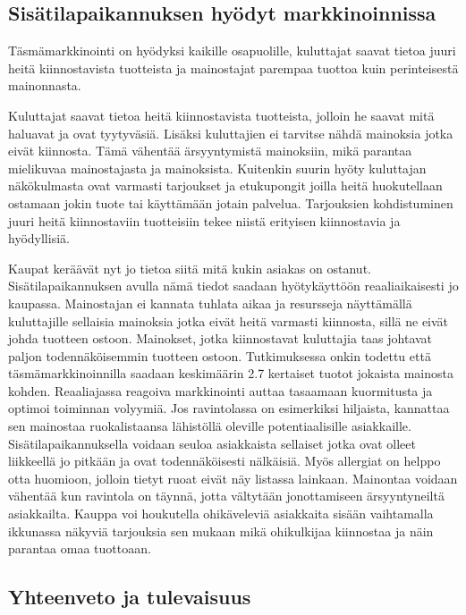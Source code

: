 \subsection{Sisätilapaikannuksen hyödyt markkinoinnissa}
Täsmämarkkinointi on hyödyksi kaikille osapuolille, kuluttajat saavat tietoa juuri heitä kiinnostavista tuotteista ja mainostajat parempaa tuottoa kuin perinteisestä mainonnasta.

Kuluttajat saavat tietoa heitä kiinnostavista tuotteista, jolloin he saavat mitä haluavat ja ovat tyytyväsiä. Lisäksi kuluttajien ei tarvitse nähdä mainoksia jotka eivät kiinnosta. Tämä vähentää ärsyyntymistä mainoksiin, mikä parantaa mielikuvaa mainostajasta ja mainoksista. Kuitenkin suurin hyöty kuluttajan näkökulmasta ovat varmasti tarjoukset ja etukupongit joilla heitä huokutellaan ostamaan jokin tuote tai käyttämään jotain palvelua. Tarjouksien kohdistuminen juuri heitä kiinnostaviin tuotteisiin tekee niistä erityisen kiinnostavia ja hyödyllisiä.

Kaupat keräävät nyt jo tietoa siitä mitä kukin asiakas on ostanut. Sisätilapaikannuksen avulla nämä tiedot saadaan hyötykäyttöön reaaliaikaisesti jo kaupassa.
Mainostajan ei kannata tuhlata aikaa ja resursseja näyttämällä kuluttajille sellaisia mainoksia jotka eivät heitä varmasti kiinnosta, sillä ne eivät johda tuotteen ostoon. Mainokset, jotka kiinnostavat kuluttajia taas johtavat paljon todennäköisemmin tuotteen ostoon. Tutkimuksessa\cite{target} onkin todettu että täsmämarkkinoinnilla saadaan keskimäärin 2.7 kertaiset tuotot jokaista mainosta kohden.
Reaaliajassa reagoiva markkinointi auttaa tasaamaan kuormitusta ja optimoi toiminnan volyymiä\cite{tasma}. Jos ravintolassa on esimerkiksi hiljaista, kannattaa sen mainostaa ruokalistaansa lähistöllä oleville potentiaalisille asiakkaille. Sisätilapaikannuksella voidaan seuloa asiakkaista sellaiset jotka ovat olleet liikkeellä jo pitkään ja ovat todennäköisesti nälkäisiä. Myös allergiat on helppo otta huomioon, jolloin tietyt ruoat eivät näy listassa lainkaan\cite{tasma}. Mainontaa voidaan vähentää kun ravintola on täynnä, jotta vältytään jonottamiseen ärsyyntyneiltä asiakkailta.
Kauppa voi houkutella ohikäveleviä asiakkaita sisään vaihtamalla ikkunassa näkyviä tarjouksia sen mukaan mikä ohikulkijaa kiinnostaa ja näin parantaa omaa tuottoaan.

\subsection{Yhteenveto ja tulevaisuus}

